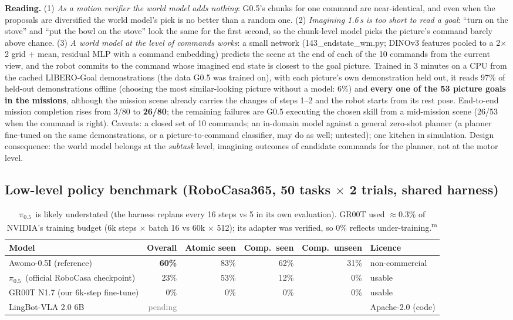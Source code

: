 \documentclass[10pt,a4paper]{article}
\newcommand{\pzf}{$\pi_{0.5}$}
\DeclareRobustCommand{\meas}{\textsuperscript{\textcolor{green!50!black}{m}}}
\DeclareRobustCommand{\pend}{\textcolor{gray}{pending}}
\begin{document}
\noindent\textbf{Reading.} (1) \emph{As a motion verifier the world model adds nothing}: G0.5's chunks for one command are near-identical, and even when the proposals are diversified the world model's pick is no better than a random one. (2) \emph{Imagining 1.6\,s is too short to read a goal}: ``turn on the stove'' and ``put the bowl on the stove'' look the same for the first second, so the chunk-level model picks the picture's command barely above chance. (3) \emph{A world model at the level of commands works}: a small network (143\_endstate\_wm.py; DINOv3 features pooled to a 2$\times$2 grid + mean, residual MLP with a command embedding) predicts the scene at the end of each of the 10 commands from the current view, and the robot commits to the command whose imagined end state is closest to the goal picture. Trained in 3 minutes on a CPU from the cached LIBERO-Goal demonstrations (the data G0.5 was trained on), with each picture's own demonstration held out, it reads 97\% of held-out demonstrations offline (choosing the most similar-looking picture without a model: 6\%) and \textbf{every one of the 53 picture goals in the missions}, although the mission scene already carries the changes of steps 1--2 and the robot starts from its rest pose. End-to-end mission completion rises from 3/80 to \textbf{26/80}; the remaining failures are G0.5 executing the chosen skill from a mid-mission scene (26/53 when the command is right). Caveats: a closed set of 10 commands; an in-domain model against a general zero-shot planner (a planner fine-tuned on the same demonstrations, or a picture-to-command classifier, may do as well; untested); one kitchen in simulation. Design consequence: the world model belongs at the \emph{subtask} level, imagining outcomes of candidate commands for the planner, not at the motor level.

\subsection{Low-level policy benchmark (RoboCasa365, 50 tasks $\times$ 2 trials, shared harness)}
\begin{table}[H]\centering\small
\setlength{\tabcolsep}{4pt}
\begin{tabular}{lrrrrl}
\toprule
Model & Overall & Atomic seen & Comp.\ seen & Comp.\ unseen & Licence \\
\midrule
Awomo-0.5I (reference) & \textbf{60\%} & 83\% & 62\% & 31\% & non-commercial \\
\pzf\ (official RoboCasa checkpoint) & 23\% & 53\% & 12\% & 0\% & usable \\
GR00T N1.7 (our 6k-step fine-tune) & 0\% & 0\% & 0\% & 0\% & usable \\
LingBot-VLA 2.0 6B & \pend & & & & Apache-2.0 (code) \\
\bottomrule
\end{tabular}
\caption{\pzf\ is likely understated (the harness replans every 16 steps vs 5 in its own evaluation). GR00T used $\approx$0.3\% of NVIDIA's training budget (6k steps $\times$ batch 16 vs 60k $\times$ 512); its adapter was verified, so 0\% reflects under-training.\meas}
\end{table}
\end{document}

